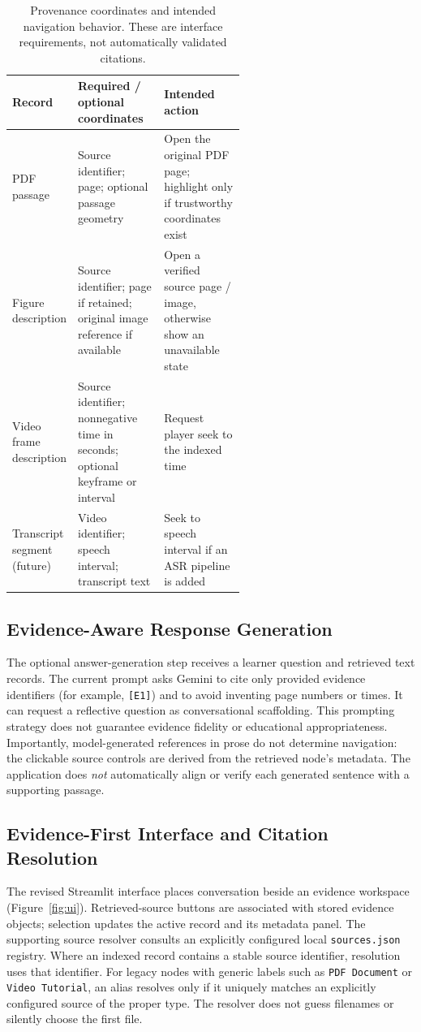 \documentclass[manuscript,screen,nonacm]{acmart}
\begin{document}
\begin{table}[t]
\caption{Provenance coordinates and intended navigation behavior. These are interface requirements, not automatically validated citations.}
\label{tab:provenance}
\small
\begin{tabularx}{\linewidth}{@{}>{\raggedright\arraybackslash}p{0.20\linewidth}>{\raggedright\arraybackslash}p{0.37\linewidth}X@{}}
\toprule
Record & Required / optional coordinates & Intended action \\
\midrule
PDF passage & Source identifier; page; optional passage geometry & Open the original PDF page; highlight only if trustworthy coordinates exist \\
Figure description & Source identifier; page if retained; original image reference if available & Open a verified source page / image, otherwise show an unavailable state \\
Video frame description & Source identifier; nonnegative time in seconds; optional keyframe or interval & Request player seek to the indexed time \\
Transcript segment (future) & Video identifier; speech interval; transcript text & Seek to speech interval if an ASR pipeline is added \\
\bottomrule
\end{tabularx}
\end{table}

\subsection{Evidence-Aware Response Generation}
The optional answer-generation step receives a learner question and retrieved text records. The current prompt asks Gemini to cite only provided evidence identifiers (for example, \texttt{[E1]}) and to avoid inventing page numbers or times. It can request a reflective question as conversational scaffolding. This prompting strategy does not guarantee evidence fidelity or educational appropriateness. Importantly, model-generated references in prose do not determine navigation: the clickable source controls are derived from the retrieved node's metadata. The application does \emph{not} automatically align or verify each generated sentence with a supporting passage.

\subsection{Evidence-First Interface and Citation Resolution}
The revised Streamlit interface places conversation beside an evidence workspace (Figure~\ref{fig:ui}). Retrieved-source buttons are associated with stored evidence objects; selection updates the active record and its metadata panel. The supporting source resolver consults an explicitly configured local \texttt{sources.json} registry. Where an indexed record contains a stable source identifier, resolution uses that identifier. For legacy nodes with generic labels such as \texttt{PDF Document} or \texttt{Video Tutorial}, an alias resolves only if it uniquely matches an explicitly configured source of the proper type. The resolver does not guess filenames or silently choose the first file.
\end{document}
